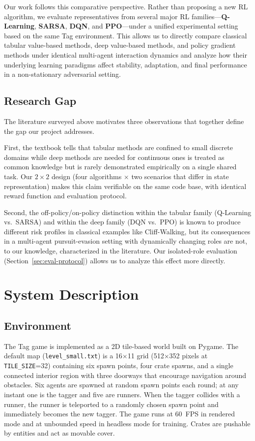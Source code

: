 \documentclass[conference]{IEEEtran}
\begin{document}
Our work follows this comparative perspective. Rather than proposing a
new RL algorithm, we evaluate representatives from several major RL
families---\textbf{Q-Learning}, \textbf{SARSA}, \textbf{DQN}, and
\textbf{PPO}---under a unified experimental setting based on the same
Tag environment. This allows us to directly compare classical
tabular value-based methods, deep value-based methods, and policy
gradient methods under identical multi-agent interaction dynamics and
analyze how their underlying learning paradigms affect stability,
adaptation, and final performance in a non-stationary adversarial
setting.
\subsection{Research Gap}\label{sec:gap}

The literature surveyed above motivates three observations that
together define the gap our project addresses.

First, the textbook tells that tabular methods are confined to small
discrete domains while deep methods are needed for continuous ones
is treated as common knowledge but is rarely demonstrated empirically
on a single shared task. Our $2{\times}2$ design (four algorithms
$\times$ two scenarios that differ in state representation) makes
this claim verifiable on the same code base, with identical reward
function and evaluation protocol.

Second, the off-policy/on-policy distinction within the tabular family
(Q-Learning vs.\ SARSA) and within the deep family (DQN vs.\ PPO) is
known to produce different risk profiles in classical examples like
Cliff-Walking, but its consequences in a multi-agent pursuit-evasion
setting with dynamically changing roles are not, to our knowledge, characterized
in the literature. Our isolated-role evaluation
(Section~\ref{sec:eval-protocol}) allows us to analyze this effect more directly.


\section{System Description}\label{sec:system}

\subsection{Environment}

The Tag game is implemented as a 2D tile-based world built on Pygame. The
default map (\texttt{level\_small.txt}) is a 16$\times$11 grid (512$\times$352
pixels at \texttt{TILE\_SIZE}=32) containing six spawn points, four crate
spawns, and a single connected interior region with three doorways that
encourage navigation around obstacles. Six agents are spawned at random spawn
points each round; at any instant one is the tagger and five are runners.
When the tagger collides with a runner, the runner is teleported to a
randomly chosen spawn point and immediately becomes the new tagger. The game
runs at 60~FPS in rendered mode and at unbounded speed in headless mode for
training. Crates are pushable by entities and act as movable cover.
\end{document}
